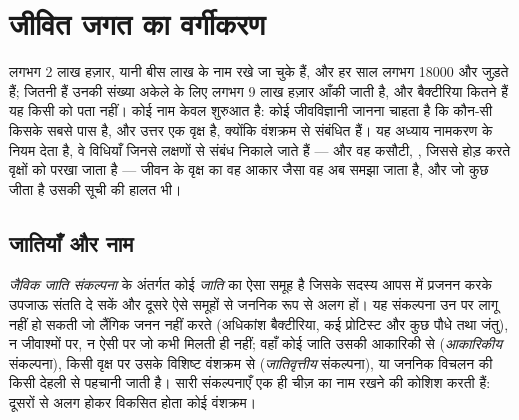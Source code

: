 \chapter{जीवित जगत का वर्गीकरण}\label{ch:b1:classifying-biodiversity}

लगभग \num{2} लाख हज़ार, यानी बीस लाख  के नाम रखे जा चुके हैं, और
हर साल लगभग \num{18000} और जुड़ते हैं; जितनी हैं उनकी संख्या अकेले
 के लिए लगभग \num{9} लाख हज़ार आँकी जाती है, और बैक्टीरिया
कितने हैं यह किसी को पता नहीं। कोई नाम केवल शुरुआत है: कोई जीवविज्ञानी
जानना चाहता है कि कौन-सी  किसके सबसे पास है, और उत्तर एक वृक्ष है,
क्योंकि  वंशक्रम से संबंधित हैं। यह अध्याय नामकरण के नियम देता है,
वे विधियाँ जिनसे लक्षणों से संबंध निकाले जाते हैं --- और वह कसौटी,
, जिससे होड़ करते वृक्षों को परखा जाता है --- जीवन के वृक्ष का
वह आकार जैसा वह अब समझा जाता है, और जो कुछ जीता है उसकी सूची की हालत भी।

\section{जातियाँ और नाम}

\begin{definition}[जाति]\label{def:b1:classifying-biodiversity:species}
\emph{जैविक जाति संकल्पना} के अंतर्गत कोई \emph{जाति}  का ऐसा
समूह है जिसके सदस्य आपस में प्रजनन करके उपजाऊ संतति दे सकें और दूसरे ऐसे
समूहों से जननिक रूप से अलग हों। यह संकल्पना उन  पर लागू नहीं हो सकती
जो लैंगिक जनन नहीं करते (अधिकांश बैक्टीरिया, कई प्रोटिस्ट और कुछ पौधे तथा
जंतु), न जीवाश्मों पर, न ऐसी  पर जो कभी मिलती ही नहीं; वहाँ कोई
जाति उसकी आकारिकी से (\emph{आकारिकीय} संकल्पना), किसी वृक्ष पर उसके
विशिष्ट वंशक्रम से (\emph{जातिवृत्तीय} संकल्पना), या जननिक विचलन की किसी
देहली से पहचानी जाती है। सारी संकल्पनाएँ एक ही चीज़ का नाम रखने की कोशिश
करती हैं: दूसरों से अलग होकर विकसित होता कोई वंशक्रम।
\end{definition}

